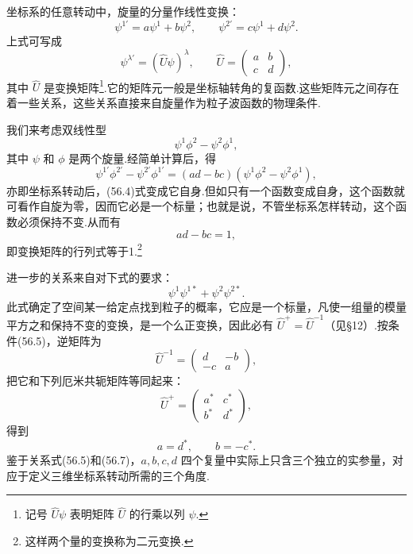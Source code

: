 坐标系的任意转动中，旋量的分量作线性变换：
\begin{equation}
  \psi^{1'}=a\psi^1+b\psi^2,\qquad
  \psi^{2'}=c\psi^1+d\psi^2.
\end{equation}
上式可写成
\begin{equation}
  \psi^{\lambda'}=(\hat{U}\psi)^{\lambda},\qquad
  \hat{U}=\left(\begin{array}{cc}a&b\\c&d\end{array}\right),
\end{equation}
其中 $\hat{U}$ 是变换矩阵\footnote{记号 $\hat{U}\psi$ 表明矩阵 $\hat{U}$ 的行乘以列 $\psi$.}.它的矩阵元一般是坐标轴转角的复函数.这些矩阵元之间存在着一些关系，这些关系直接来自旋量作为粒子波函数的物理条件.

我们来考虑双线性型
\begin{equation}
  \psi^1\phi^2-\psi^2\phi^1,
\end{equation}
其中 $\psi$ 和 $\phi$ 是两个旋量.经简单计算后，得
\begin{equation*}
  \psi^{1'}\phi^{2'}-\psi^{2'}\phi^{1'}=(ad-bc)(\psi^1\phi^2-\psi^2\phi^1),
\end{equation*}
亦即坐标系转动后，(56.4)式变成它自身.但如只有一个函数变成自身，这个函数就可看作自旋为零，因而它必是一个标量；也就是说，不管坐标系怎样转动，这个函数必须保持不变.从而有
\begin{equation}
  ad-bc=1,
\end{equation}
即变换矩阵的行列式等于1.\footnote{这样两个量的变换称为二元变换.}

进一步的关系来自对下式的要求：
\begin{equation}
  \psi^1\psi^{1*}+\psi^2\psi^{2*}.
\end{equation}
此式确定了空间某一给定点找到粒子的概率，它应是一个标量，凡使一组量的模量平方之和保持不变的变换，是一个么正变换，因此必有 $\hat{U}^+=\hat{U}^{-1}$（见§12）.按条件(56.5)，逆矩阵为
\begin{equation*}
  \hat{U}^{-1}=\left(\begin{array}{rr}d&-b\\-c&a\end{array}\right),
\end{equation*}
把它和下列厄米共轭矩阵等同起来：
\begin{equation*}
  \hat{U}^{+}=\left(\begin{array}{cc}a^*&c^*\\b^*&d^*\end{array}\right),
\end{equation*}
得到
\begin{equation}
  a=d^*,\qquad b=-c^*.
\end{equation}
鉴于关系式(56.5)和(56.7)，$a,b,c,d$ 四个复量中实际上只含三个独立的实参量，对应于定义三维坐标系转动所需的三个角度.


